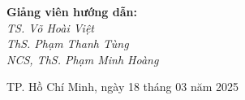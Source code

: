 \begin{titlepage}
\begin{center}
\begin{minipage}{0.75\textwidth}
            \vspace{0.6cm}

            \textbf{\large Giảng viên hướng dẫn:}\\[5pt]
            \textit{TS. Võ Hoài Việt}\\
            \textit{ThS. Phạm Thanh Tùng}\\
            \textit{NCS, ThS. Phạm Minh Hoàng}
        \end{minipage}

        \vspace{1.0cm}

        {\fontsize{12}{14}\selectfont TP. Hồ Chí Minh, ngày 18 tháng 03 năm 2025}
    \end{center}
\end{titlepage}